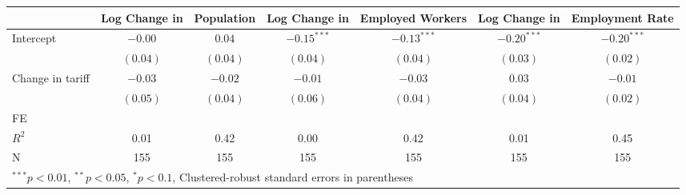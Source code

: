 
\begin{tabular}{l c c c c c c }
\hline
 & Log Change in & Population & Log Change in & Employed Workers & Log Change in & Employment Rate \\
\hline
Intercept & $-0.00$  & $0.04$   & $-0.15^{***}$ & $-0.13^{***}$ & $-0.20^{***}$ & $-0.20^{***}$ \\
            & $(0.04)$ & $(0.04)$ & $(0.04)$      & $(0.04)$      & $(0.03)$      & $(0.02)$      \\
Change in tariff     & $-0.03$  & $-0.02$  & $-0.01$       & $-0.03$       & $0.03$        & $-0.01$       \\
            & $(0.05)$ & $(0.04)$ & $(0.06)$      & $(0.04)$      & $(0.04)$      & $(0.02)$      \\
\hline
FE          &                &                &                &                &                &                \\ 
\hline
$R^2$       & 0.01     & 0.42     & 0.00          & 0.42          & 0.01          & 0.45          \\
N           & 155      & 155      & 155           & 155           & 155           & 155           \\
\hline
\multicolumn{7}{l}{\scriptsize{$^{***}p<0.01$, $^{**}p<0.05$, $^*p<0.1$, Clustered-robust standard errors in parentheses}}
\end{tabular}
